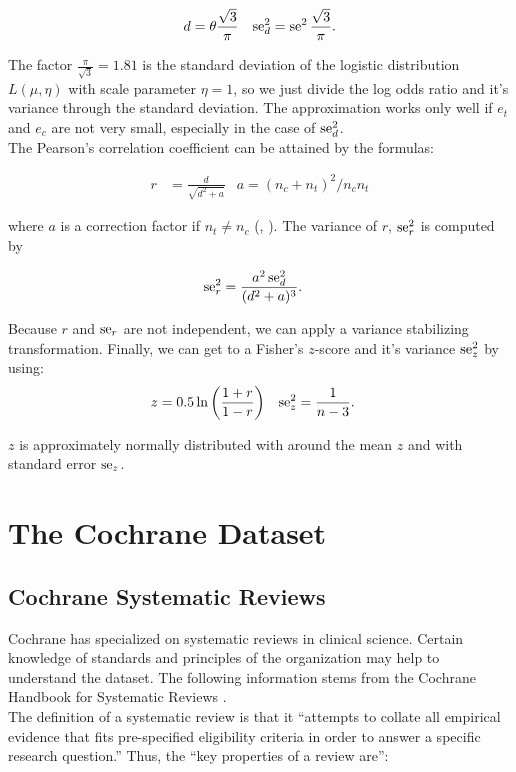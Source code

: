 \documentclass[11pt,a4paper,twoside]{book}\usepackage[]{graphicx}\usepackage[]{color}
\begin{document}
\begin{align}
d &= \theta \frac{\sqrt{3}}{\pi} & \operatorname{se}_d^2 =  \operatorname{se}^2\frac{\sqrt{3}}{\pi}. \nonumber
\end{align}

The factor $\frac{\pi}{\sqrt{3}} = 1.81$ is the standard deviation of the logistic distribution $L(\mu, \eta)$ with scale parameter $\eta = 1$, so we just divide the log odds ratio and it's variance through the standard deviation. The approximation works only well if $e_t$ and $e_c$ are not very small, especially in the case of $\operatorname{se}_d^2$. \\
The Pearson's correlation coefficient can be attained by the formulas:

\begin{align}
r &= \frac{d}{\sqrt{d^2 + a}} & a = (n_c + n_t)^2 / n_c n_t \nonumber
\end{align}

where $a$ is a correction factor if $n_t \neq n_c$ (\citealp{olkin1985dtor}, \citealp{Intro.meta}). The variance of $r$, $\operatorname{se}_r^2$ is computed by

\begin{align}
\operatorname{se}_r^2 &= \frac{a^2 \operatorname{se}_d^2}{(d^2 + a)^3}. \nonumber
\end{align}

Because $r$ and $\operatorname{se}_r$ are not independent, we can apply a variance stabilizing transformation. Finally, we can get to a Fisher's $z$-score and it's variance $\operatorname{se}_z^2$ by using:
\begin{align}
z &= 0.5 \ln\bigg(\frac{1 + r}{1 - r}\bigg) & \nonumber
\operatorname{se}_z^2 &= \frac{1}{n-3}.
\end{align}

$z$ is approximately normally distributed with around the mean $z$ and with standard error $\operatorname{se}_z$.













\chapter{The Cochrane Dataset} \label{ch:dataset}


\section{Cochrane Systematic Reviews}
Cochrane has specialized on systematic reviews in clinical science. Certain knowledge of standards and principles of the organization may help to understand the dataset. The following information stems from the Cochrane Handbook for Systematic Reviews \citep{cochrane.handbook}. \\
The definition of a systematic review is that it ``attempts to collate all empirical evidence that fits pre-specified eligibility criteria in order to answer a specific research question.'' Thus, the ``key properties of a review are'':
\end{document}
